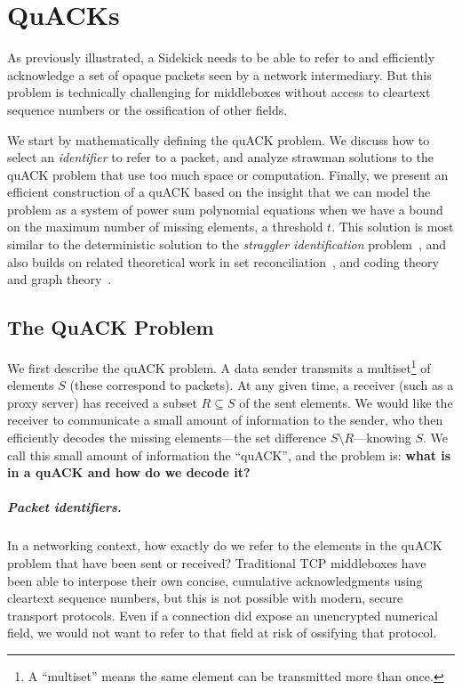 
\chapter{QuACKs}

As previously illustrated, a Sidekick needs to be able to refer to and efficiently
acknowledge a set of opaque packets seen by a network intermediary.
But this problem is technically challenging for middleboxes without access to
cleartext sequence numbers or the ossification of other fields.

We start by mathematically defining the quACK problem.
We discuss how to select an \emph{identifier} to refer to a packet,
and analyze strawman solutions to the quACK problem
that use too much space or computation.
Finally, we present an efficient construction of a quACK based on the insight
that we can model the problem as a system of power sum polynomial equations
when we have a bound on the maximum number of missing elements, a threshold $t$.
This solution is most similar to the deterministic solution to the
\emph{straggler identification} problem~\cite{eppstein2011straggler}, and also builds on
related theoretical work in set reconciliation~\cite{minsky2003set}, and coding
theory and graph theory~\cite{karpovsky2003data}.

\section{The QuACK Problem}

We first describe the quACK problem. A data sender transmits a multiset\footnote
{A ``multiset'' means the same element can be transmitted more than once.} of
elements $S$ (these correspond to packets). At any given time, a receiver
(such as a proxy server) has received a subset $R \subseteq S$ of the sent
elements. We would like the receiver to communicate a small amount of
information to the sender, who then efficiently decodes the missing
elements---the set difference $S \setminus R$---knowing $S$. We call this small
amount of information the ``quACK'', and the problem is:
\textbf{what is in a quACK and how do we decode it?}

\paragraph{Packet identifiers.}

In a networking context, how exactly do we refer to the elements
in the quACK problem that have been sent or received?
Traditional TCP middleboxes have been able to interpose their
own concise, cumulative acknowledgments using cleartext sequence numbers, but
this is not possible with modern, secure transport protocols. Even if a
connection did expose an unencrypted numerical field, we would not want to
refer to that field at risk of ossifying that protocol.


